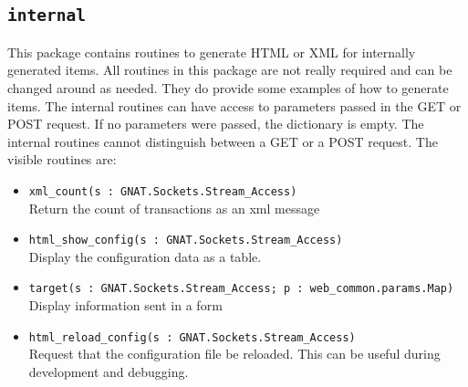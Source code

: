 \documentclass[10pt, openany, draft]{article}
\begin{document}
\subsection{\texttt{internal}}
This package contains routines to generate HTML or XML for internally generated items.  All routines in this package are not really required and can be changed around as needed.  They do provide some examples of how to generate items.  The internal routines can have access to parameters passed in the GET or POST request.  If no parameters were passed, the dictionary is empty.  The internal routines cannot distinguish between a GET or a POST request.  The visible routines are:
\begin{itemize}
  \item \verb|xml_count(s : GNAT.Sockets.Stream_Access)|\\
  Return the count of transactions as an xml message
  \item \verb|html_show_config(s : GNAT.Sockets.Stream_Access)|\\
  Display the configuration data as a table.
  \item \verb|target(s : GNAT.Sockets.Stream_Access; p : web_common.params.Map)|\\
  Display information sent in a form
  \item \verb|html_reload_config(s : GNAT.Sockets.Stream_Access)|\\
  Request that the configuration file be reloaded.  This can be useful during development and debugging.
\end{itemize}
\end{document}
